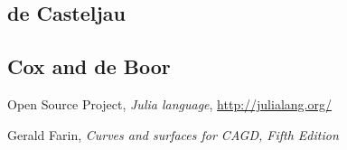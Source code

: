 \documentclass{article}
\begin{document}
\subsection{de Casteljau}
\label{sec:deCasteljau-code}


\subsection{Cox and de Boor}
\label{sec:Cox-deBoor-code}


\newpage

\begin{thebibliography}{}

 Open Source Project,
  \emph{Julia language}, \url{http://julialang.org/}

 Gerald Farin,
  \textit{Curves and surfaces for CAGD, Fifth Edition}


\end{thebibliography}
\end{document}
